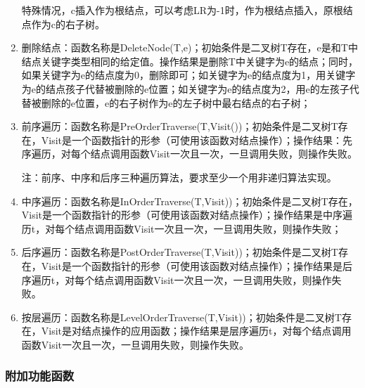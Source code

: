 \documentclass[supercite]{Experimental_Report}
\theoremstyle{definition}
\begin{document}
\begin{enumerate}
特殊情况，c插入作为根结点，可以考虑LR为-1时，作为根结点插入，原根结点作为c的右子树。
	\item 删除结点：函数名称是DeleteNode(T,e)；初始条件是二叉树T存在，e是和T中结点关键字类型相同的给定值。操作结果是删除T中关键字为e的结点；同时，如果关键字为e的结点度为0，删除即可；如关键字为e的结点度为1，用关键字为e的结点孩子代替被删除的e位置；如关键字为e的结点度为2，用e的左孩子代替被删除的e位置，e的右子树作为e的左子树中最右结点的右子树；
	\item 前序遍历：函数名称是PreOrderTraverse(T,Visit())；初始条件是二叉树T存在，Visit是一个函数指针的形参（可使用该函数对结点操作）；操作结果：先序遍历，对每个结点调用函数Visit一次且一次，一旦调用失败，则操作失败。

注：前序、中序和后序三种遍历算法，要求至少一个用非递归算法实现。

	\item 中序遍历：函数名称是InOrderTraverse(T,Visit))；初始条件是二叉树T存在，Visit是一个函数指针的形参（可使用该函数对结点操作）；操作结果是中序遍历t，对每个结点调用函数Visit一次且一次，一旦调用失败，则操作失败；
	\item 后序遍历：函数名称是PostOrderTraverse(T,Visit))；初始条件是二叉树T存在，Visit是一个函数指针的形参（可使用该函数对结点操作）；操作结果是后序遍历t，对每个结点调用函数Visit一次且一次，一旦调用失败，则操作失败。
	\item 按层遍历：函数名称是LevelOrderTraverse(T,Visit))；初始条件是二叉树T存在，Visit是对结点操作的应用函数；操作结果是层序遍历t，对每个结点调用函数Visit一次且一次，一旦调用失败，则操作失败。
\end{enumerate}

\subsubsection{附加功能函数}
\end{document}
